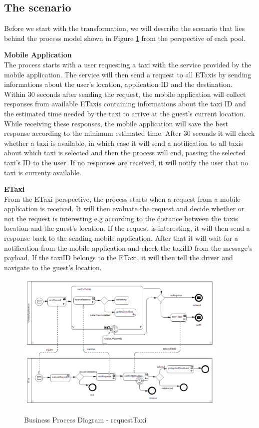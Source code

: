 \newpage
\subsection{The scenario}
Before we start with the transformation, we will describe the scenario that lies behind the process model shown in Figure \ref{fig:example} from the perspective of each pool. 

\textbf{Mobile Application}\\
The process starts with a user requesting a taxi with the service provided by the mobile application. The service will then send a request to all ETaxis by sending informations about the user's location, application ID and the destination. Within 30 seconds after sending the request, the mobile application will collect responses from available ETaxis containing informations about the taxi ID and the estimated time needed by the taxi to arrive at the guest's current location. While receiving these responses, the mobile application will save the best response according to the minimum estimated time. After 30 seconds it will check whether a taxi is available, in which case it will send a notification to all taxis about which taxi is selected and then the process will end, passing the selected taxi's ID to the user. If no responses are received, it will notify the user that no taxi is currenty available. 


\textbf{ETaxi}\\
From the ETaxi perspective, the process starts when a request from a mobile application is received. It will then evaluate the request and decide whether or not the request is interesting e.g according to the distance between the taxis location and the guest's location. If the request is interesting, it will then send a response back to the sending mobile application. After that it will wait for a notification from the mobile application and check the taxiID from the message's payload. If the taxiID belongs to the ETaxi, it will then tell the driver and navigate to the guest's location.

\begin{figure}
	\centering
		\includegraphics[width = 0.9\textwidth]{images/example/requestTaxi.png}
	\label{fig:example}
	\caption{Business Process Diagram - requestTaxi}
\end{figure}

